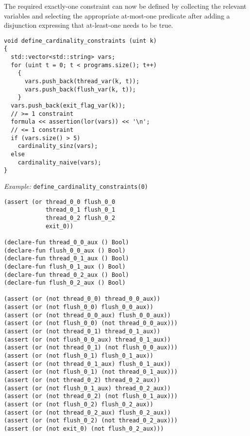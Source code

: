 
\noindent
The required exactly-one constraint can now be defined by collecting the relevant variables and selecting the appropriate at-most-one predicate after adding a disjunction expressing that at-least-one needs to be true.

\begin{lstlisting}[style=c++]
void define_cardinality_constraints (uint k)
{
  std::vector<std::string> vars;
  for (uint t = 0; t < programs.size(); t++)
    {
      vars.push_back(thread_var(k, t));
      vars.push_back(flush_var(k, t));
    }
  vars.push_back(exit_flag_var(k));
  // >= 1 constraint
  formula << assertion(lor(vars)) << '\n';
  // <= 1 constraint
  if (vars.size() > 5)
    cardinality_sinz(vars);
  else
    cardinality_naive(vars);
}
\end{lstlisting}

\newpage

\noindent
\emph{Example:} \lstinline[style=c++]{define_cardinality_constraints(0)}

\begin{lstlisting}[language=SMTLib]
(assert (or thread_0_0 flush_0_0
            thread_0_1 flush_0_1
            thread_0_2 flush_0_2
            exit_0))

(declare-fun thread_0_0_aux () Bool)
(declare-fun flush_0_0_aux () Bool)
(declare-fun thread_0_1_aux () Bool)
(declare-fun flush_0_1_aux () Bool)
(declare-fun thread_0_2_aux () Bool)
(declare-fun flush_0_2_aux () Bool)

(assert (or (not thread_0_0) thread_0_0_aux))
(assert (or (not flush_0_0) flush_0_0_aux))
(assert (or (not thread_0_0_aux) flush_0_0_aux))
(assert (or (not flush_0_0) (not thread_0_0_aux)))
(assert (or (not thread_0_1) thread_0_1_aux))
(assert (or (not flush_0_0_aux) thread_0_1_aux))
(assert (or (not thread_0_1) (not flush_0_0_aux)))
(assert (or (not flush_0_1) flush_0_1_aux))
(assert (or (not thread_0_1_aux) flush_0_1_aux))
(assert (or (not flush_0_1) (not thread_0_1_aux)))
(assert (or (not thread_0_2) thread_0_2_aux))
(assert (or (not flush_0_1_aux) thread_0_2_aux))
(assert (or (not thread_0_2) (not flush_0_1_aux)))
(assert (or (not flush_0_2) flush_0_2_aux))
(assert (or (not thread_0_2_aux) flush_0_2_aux))
(assert (or (not flush_0_2) (not thread_0_2_aux)))
(assert (or (not exit_0) (not flush_0_2_aux)))
\end{lstlisting}

